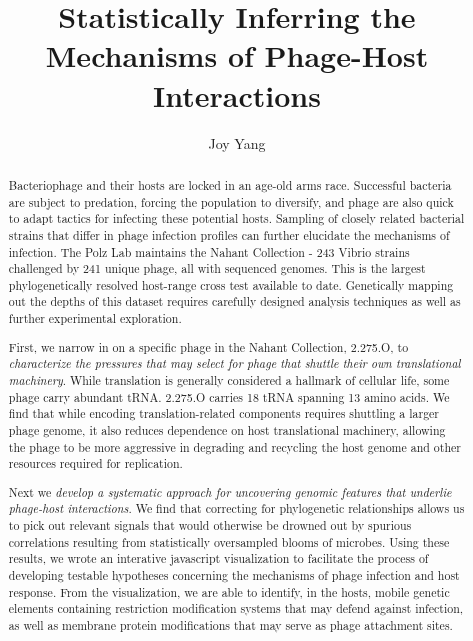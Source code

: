 \documentclass[12pt,twoside]{mitthesis-manusdown}
\title{Statistically Inferring the Mechanisms of Phage-Host Interactions}
\author{Joy Yang}
\begin{document}
\pagestyle{plain}
  \maketitle
\begin{abstract}
	Bacteriophage and their hosts are locked in an age-old arms race.
Successful bacteria are subject to predation, forcing the population to
diversify, and phage are also quick to adapt tactics for infecting these
potential hosts. Sampling of closely related bacterial strains that
differ in phage infection profiles can further elucidate the mechanisms
of infection. The Polz Lab maintains the Nahant Collection - 243 Vibrio
strains challenged by 241 unique phage, all with sequenced genomes. This
is the largest phylogenetically resolved host-range cross test available
to date. Genetically mapping out the depths of this dataset requires
carefully designed analysis techniques as well as further experimental
exploration.

First, we narrow in on a specific phage in the Nahant Collection,
2.275.O, to \emph{characterize the pressures that may select for phage
that shuttle their own translational machinery}. While translation is
generally considered a hallmark of cellular life, some phage carry
abundant tRNA. 2.275.O carries 18 tRNA spanning 13 amino acids. We find
that while encoding translation-related components requires shuttling a
larger phage genome, it also reduces dependence on host translational
machinery, allowing the phage to be more aggressive in degrading and
recycling the host genome and other resources required for replication.

Next we \emph{develop a systematic approach for uncovering genomic
features that underlie phage-host interactions}. We find that correcting
for phylogenetic relationships allows us to pick out relevant signals
that would otherwise be drowned out by spurious correlations resulting
from statistically oversampled blooms of microbes. Using these results,
we wrote an interative javascript visualization to facilitate the
process of developing testable hypotheses concerning the mechanisms of
phage infection and host response. From the visualization, we are able
to identify, in the hosts, mobile genetic elements containing
restriction modification systems that may defend against infection, as
well as membrane protein modifications that may serve as phage
attachment sites.
\end{abstract}


  \hypersetup{linkcolor=black}
  \setcounter{tocdepth}{2}
  \tableofcontents
\end{document}
